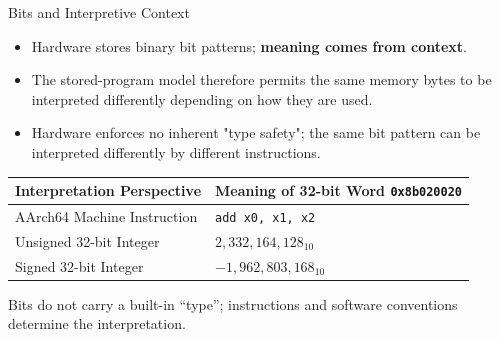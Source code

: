 \documentclass[aspectratio=169,11pt,t]{beamer}
\newcommand{\key}[1]{\textbf{#1}}
\newcommand{\hex}[1]{\texttt{0x#1}}
\newcommand{\code}[1]{\texttt{#1}}
\begin{document}
\begin{frame}{Bits and Interpretive Context}

\begin{itemize}\setlength{\itemsep}{5pt}
  \item Hardware stores binary bit patterns; \key{meaning comes from context}.
  \item The stored-program model therefore permits the same memory bytes to be interpreted differently depending on how they are used.
  \item Hardware enforces no inherent "type safety"; the same bit pattern can be interpreted differently by different instructions.
\end{itemize}

\vfill

\begin{center}

\footnotesize

\begin{tabular}{ll}
\toprule
\textbf{Interpretation Perspective}
&
\textbf{Meaning of 32-bit Word \hex{8b020020}}
\\
\midrule
AArch64 Machine Instruction
&
\code{add x0, x1, x2}
\\
Unsigned 32-bit Integer
&
$2{,}332{,}164{,}128_{10}$
\\
Signed 32-bit Integer
&
$-1{,}962{,}803{,}168_{10}$
\\
\bottomrule
\end{tabular}

\end{center}

\vfill

\small

Bits do not carry a built-in ``type''; instructions and software conventions determine the interpretation.

\end{frame}





\end{document}
